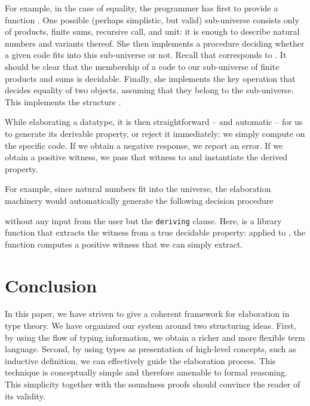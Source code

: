 \documentclass{scrartcl}
\theoremstyle{plain}
\theoremstyle{definition}
\begin{document}
\newcommand{\eqDesc}{\Function{eqDesc}}
\newcommand{\decideInEq}{\Function{membershipEq}}
\newcommand{\deriveEq}{\Function{deriveEq}}

For example, in the case of equality, the programmer has first to
provide a function . One
possible (perhaps simplistic, but valid) sub-universe consists only of
products, finite sums, recursive call, and unit: it is enough to describe
natural numbers and variants thereof. She then implements a procedure
 deciding whether a given
 code fits into this sub-universe or not. Recall that
 corresponds to . It should be clear that the membership of a
 code to our sub-universe of finite products and sums is
decidable. Finally, she implements the key operation
 that
decides equality of two objects, assuming that they belong to the
sub-universe. This implements the structure
.


While elaborating a datatype, it is then straightforward -- and
automatic -- for us to generate its derivable property, or reject it
immediately: we simply compute  on the specific code. If
we obtain a negative response, we report an error. If we obtain a
positive witness, we pass that witness to  and instantiate
the derived property. 

For example, since natural numbers fit into the  universe,
the elaboration machinery would automatically generate the following
decision procedure

without any input from the user but the \texttt{deriving}
 clause. Here,  is a library function
that extracts the witness from a true decidable property: applied to
, the function  computes a positive witness
that we can simply extract.



\newpage
\section{Conclusion}



In this paper, we have striven to give a coherent framework for
elaboration in type theory. We have organized our system around two
structuring ideas. First, by using the flow of typing information, we
obtain a richer and more flexible term language. Second, by using
types as presentation of high-level concepts, such as inductive
definition, we can effectively guide the elaboration process. This
technique is conceptually simple and therefore amenable to formal
reasoning. This simplicity together with the soundness proofs should
convince the reader of its validity.
\end{document}
